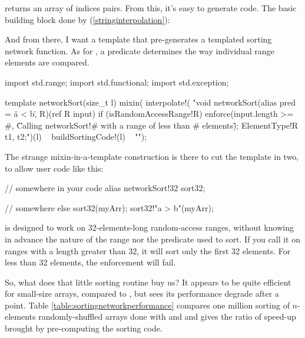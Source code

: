  returns an array of indices pairs. From this, it's easy to generate code. The basic building block done by  (\ref{stringinterpolation}):


And from there, I want a template that pre-generates a templated sorting network function. As for , a predicate  determines the way individual range elements are compared.

\begin{dcode}
import std.range;
import std.functional;
import std.exception;

template networkSort(size_t l)
{
    mixin(
interpolate!(
    "void networkSort(alias pred = \"a < b\", R)(ref R input)
     if (isRandomAccessRange!R)
     { 
         enforce(input.length >= #, 
                 \"Calling networkSort!# with a range of less than # elements\");
	      ElementType!R t1, t2;")(l)
      ~ buildSortingCode!(l) 
 ~ "}");
}
\end{dcode}

The strange mixin-in-a-template construction is there to cut the template in two, to allow user code like this:

\begin{dcode}
// somewhere in your code
alias networkSort!32 sort32;

// somewhere else
sort32(myArr);
sort32!"a > b"(myArr);
\end{dcode}

 is designed to work on 32-elements-long random-access ranges, without knowing in advance the nature of the range nor the predicate used to sort. If you call it on ranges with a length greater than 32, it will sort only the first 32 elements. For less than 32 elements, the enforcement will fail.

So, what does that little sorting routine buy us? It appears to be quite efficient for small-size arrays, compared to , but sees its performance degrade after a point. Table \ref{table:sortingnetworkperformance} compares one million sorting of $n$-elements randomly-shuffled arrays done with  and  and gives the ratio of speed-up brought by pre-computing the sorting code. 

